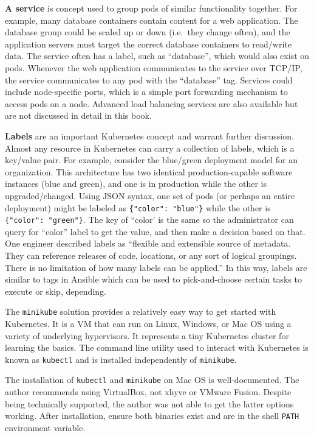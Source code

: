 \textbf{A service} is concept used to group pods of similar functionality
together. For example, many database containers contain content for a web
application. The database group could be scaled up or down (i.e.\ they change
often), and the application servers must target the correct database
containers to read/write data. The service often has a label, such as
``database'', which would also exist on pods. Whenever the web application
communicates to the service over TCP/IP, the service communicates to any pod
with the ``database'' tag. Services could include node-specific ports, which is
a simple port forwarding mechanism to access pods on a node. Advanced load
balancing services are also available but are not discussed in detail in this
book.

\textbf{Labels} are an important Kubernetes concept and warrant further
discussion. Almost any resource in Kubernetes can carry a collection of
labels, which is a key/value pair. For example, consider the blue/green
deployment model for an organization. This architecture has two identical
production-capable software instances (blue and green), and one is in
production while the other is upgraded/changed. Using JSON syntax, one set of
pods (or perhaps an entire deployment) might be labeled as \verb|{"color": "blue"}|
while the other is \verb|{"color": "green"}|. The key of ``color' is the same so
the administrator can query for ``color'' label to get the value, and then make
a decision based on that. One engineer described labels as ``flexible and
extensible source of metadata. They can reference releases of code, locations,
or any sort of logical groupings. There is no limitation of how many labels
can be applied.'' In this way, labels are similar to tags in Ansible which can
be used to pick-and-choose certain tasks to execute or skip, depending.

The \verb|minikube| solution provides a relatively easy way to get started
with Kubernetes. It is a VM that can run on Linux, Windows, or Mac OS using a
variety of underlying hypervisors. It represents a tiny Kubernetes cluster for
learning the basics. The command line utility used to interact with Kubernetes
is known as \verb|kubectl| and is installed independently of \verb|minikube|.

The installation of \verb|kubectl| and \verb|minikube| on Mac OS is
well-documented. The author recommends using VirtualBox, not xhyve or VMware
Fusion. Despite being technically supported, the author was not able to get
the latter options working. After installation, ensure both binaries exist and
are in the shell \verb|PATH| environment variable.

